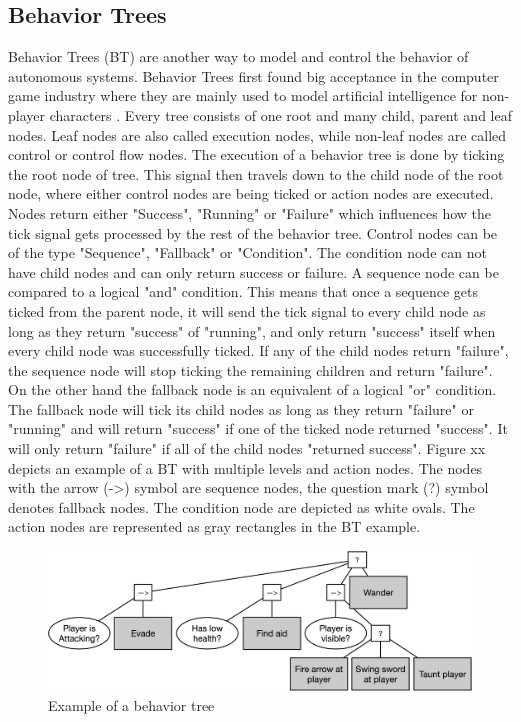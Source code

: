 \subsection{Behavior Trees}
Behavior Trees (BT) are another way to model and control the behavior of autonomous systems. Behavior Trees first found big acceptance in the computer game industry where they are mainly used to model artificial intelligence for non-player characters \cite{florez2009}. Every tree consists of one root and many child, parent and leaf nodes. Leaf nodes are also called execution nodes, while non-leaf nodes are called control or control flow nodes. 
The execution of a behavior tree is done by ticking the root node of tree. This signal then travels down to the child node of the root node, where either control nodes are being ticked or action nodes are executed. Nodes return either "Success", "Running" or "Failure" which influences how the tick signal gets processed by the rest of the behavior tree. Control nodes can be of the type "Sequence", "Fallback" or "Condition". The condition node can not have child nodes and can only return success or failure. A sequence node can be compared to a logical "and" condition. This means that once a sequence gets ticked from the parent node, it will send the tick signal to every child node as long as they return "success" of "running", and only return "success" itself when every child node was successfully ticked. If any of the child nodes return "failure", the sequence node will stop ticking the remaining children and return "failure". On the other hand the fallback node is an equivalent of a logical "or" condition. The fallback node will tick its child nodes as long as they return "failure" or "running" and will return "success" if one of the ticked node returned "success". It will only return "failure" if all of the child nodes "returned success".
Figure xx depicts an example of a BT with multiple levels and action nodes. The nodes with the arrow (->) symbol are sequence nodes, the question mark (?) symbol denotes fallback nodes. The condition node are depicted as white ovals. The action nodes are represented as gray rectangles in the BT example.

\begin{figure}
	\includegraphics[width=1.0\textwidth]{images/bt_example.jpg} 
	\caption{Example of a behavior tree \cite{iovino2022} }
\end{figure}

